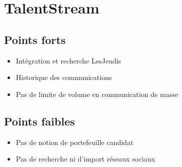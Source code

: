 \documentclass[12pt,twoside]{scrreprt}
\begin{document}
\section{TalentStream}

\subsection{Points forts}
\begin{itemize}
	\item Intégration et recherche LesJeudis
	\item Historique des communications
	\item Pas de limite de volume en communication de masse 
\end{itemize}

\subsection{Points faibles}
\begin{itemize}
	\item Pas de notion de portefeuille candidat
	\item Pas de recherche ni d'import réseaux sociaux
\end{itemize}


%

% 
\end{document}
